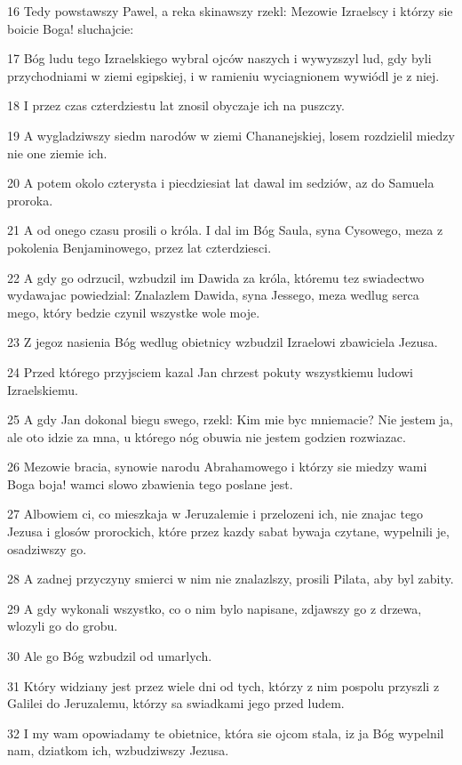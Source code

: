 \par 16 Tedy powstawszy Pawel, a reka skinawszy rzekl: Mezowie Izraelscy i którzy sie boicie Boga! sluchajcie:
\par 17 Bóg ludu tego Izraelskiego wybral ojców naszych i wywyzszyl lud, gdy byli przychodniami w ziemi egipskiej, i w ramieniu wyciagnionem wywiódl je z niej.
\par 18 I przez czas czterdziestu lat znosil obyczaje ich na puszczy.
\par 19 A wygladziwszy siedm narodów w ziemi Chananejskiej, losem rozdzielil miedzy nie one ziemie ich.
\par 20 A potem okolo czterysta i piecdziesiat lat dawal im sedziów, az do Samuela proroka.
\par 21 A od onego czasu prosili o króla. I dal im Bóg Saula, syna Cysowego, meza z pokolenia Benjaminowego, przez lat czterdziesci.
\par 22 A gdy go odrzucil, wzbudzil im Dawida za króla, któremu tez swiadectwo wydawajac powiedzial: Znalazlem Dawida, syna Jessego, meza wedlug serca mego, który bedzie czynil wszystke wole moje.
\par 23 Z jegoz nasienia Bóg wedlug obietnicy wzbudzil Izraelowi zbawiciela Jezusa.
\par 24 Przed którego przyjsciem kazal Jan chrzest pokuty wszystkiemu ludowi Izraelskiemu.
\par 25 A gdy Jan dokonal biegu swego, rzekl: Kim mie byc mniemacie? Nie jestem ja, ale oto idzie za mna, u którego nóg obuwia nie jestem godzien rozwiazac.
\par 26 Mezowie bracia, synowie narodu Abrahamowego i którzy sie miedzy wami Boga boja! wamci slowo zbawienia tego poslane jest.
\par 27 Albowiem ci, co mieszkaja w Jeruzalemie i przelozeni ich, nie znajac tego Jezusa i glosów prorockich, które przez kazdy sabat bywaja czytane, wypelnili je, osadziwszy go.
\par 28 A zadnej przyczyny smierci w nim nie znalazlszy, prosili Pilata, aby byl zabity.
\par 29 A gdy wykonali wszystko, co o nim bylo napisane, zdjawszy go z drzewa, wlozyli go do grobu.
\par 30 Ale go Bóg wzbudzil od umarlych.
\par 31 Który widziany jest przez wiele dni od tych, którzy z nim pospolu przyszli z Galilei do Jeruzalemu, którzy sa swiadkami jego przed ludem.
\par 32 I my wam opowiadamy te obietnice, która sie ojcom stala, iz ja Bóg wypelnil nam, dziatkom ich, wzbudziwszy Jezusa.
